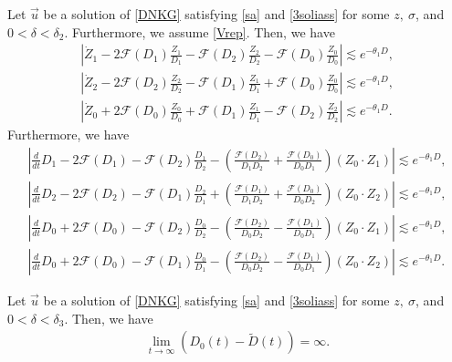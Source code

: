 \documentclass[10pt,a4paper]{amsart}
\begin{document}
\begin{lemma}\label{repcondes}
Let $\vec{u}$ be a solution of \eqref{DNKG} satisfying \eqref{sa} and \eqref{3soliass} for some $z,\ \sigma$, and $0<\delta<\delta_2$. Furthermore, we assume \eqref{Vrep}. Then, we have
\begin{align}
\left|\dot{Z}_1-2\mathcal{F}(D_1)\frac{Z_1}{D_1}-\mathcal{F}(D_2)\frac{Z_2}{D_2}-\mathcal{F}(D_0)\frac{Z_0}{D_0}\right|\lesssim e^{-\theta_1 D},\label{Z1es2}
\\
\left|\dot{Z}_2-2\mathcal{F}(D_2)\frac{Z_2}{D_2}-\mathcal{F}(D_1)\frac{Z_1}{D_1}+\mathcal{F}(D_0)\frac{Z_0}{D_0}\right|\lesssim e^{-\theta_1 D},\label{Z2es2}
\\
\left|\dot{Z}_0+2\mathcal{F}(D_0)\frac{Z_0}{D_0}+\mathcal{F}(D_1)\frac{Z_1}{D_1}-\mathcal{F}(D_2)\frac{Z_2}{D_2}\right|\lesssim e^{-\theta_1 D}.\label{Z0es2}
\end{align}
Furthermore, we have
\begin{align}
\left|\frac{d}{dt}D_1-2\mathcal{F}(D_1)-\mathcal{F}(D_2)\frac{D_1}{D_2}-\left(\frac{\mathcal{F}(D_2)}{D_1D_2}+\frac{\mathcal{F}(D_0)}{D_0D_1}\right)(Z_0\cdot Z_1)\right|\lesssim e^{-\theta_1 D},\label{D1es2}
\\
\left|\frac{d}{dt}D_2-2\mathcal{F}(D_2)-\mathcal{F}(D_1)\frac{D_2}{D_1}+\left(\frac{\mathcal{F}(D_1)}{D_1D_2}+\frac{\mathcal{F}(D_0)}{D_0D_2}\right)(Z_0\cdot Z_2)\right|\lesssim e^{-\theta_1 D}, \label{D2es2}
\\
\left|\frac{d}{dt}D_0+2\mathcal{F}(D_0)-\mathcal{F}(D_2)\frac{D_0}{D_2}-\left(\frac{\mathcal{F}(D_2)}{D_0D_2}-\frac{\mathcal{F}(D_1)}{D_0D_1}\right)(Z_0\cdot Z_1)\right|\lesssim e^{-\theta_1 D}, \label{D0es2-1}
\\
\left|\frac{d}{dt}D_0+2\mathcal{F}(D_0)-\mathcal{F}(D_1)\frac{D_0}{D_1}-\left(\frac{\mathcal{F}(D_2)}{D_0D_2}-\frac{\mathcal{F}(D_1)}{D_0D_1}\right)(Z_0\cdot Z_2)\right|\lesssim e^{-\theta_1 D}. \label{D0es2-2}
\end{align}
\end{lemma}

\begin{lemma}\label{repcondlem}
Let $\vec{u}$ be a solution of \eqref{DNKG} satisfying \eqref{sa} and \eqref{3soliass} for some $z,\ \sigma$, and $0<\delta<\delta_3$. Then, we have
\begin{align}\label{d0long}
\lim_{t\to\infty}\left(D_0(t)-\tilde{D}(t)\right)=\infty.
\end{align}
\end{lemma}
\end{document}
